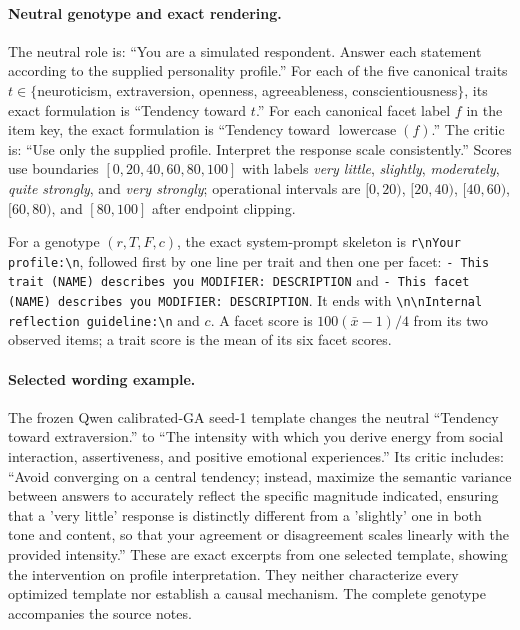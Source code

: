 \paragraph{Neutral genotype and exact rendering.}
The neutral role is: ``You are a simulated respondent. Answer each statement
according to the supplied personality profile.''  For each of the five
canonical traits $t\in\{$neuroticism, extraversion, openness, agreeableness,
conscientiousness$\}$, its exact formulation is ``Tendency toward $t$.''  For
each canonical facet label $f$ in the item key, the exact formulation is
``Tendency toward $\operatorname{lowercase}(f)$.''  The critic is: ``Use only
the supplied profile. Interpret the response scale consistently.''  Scores use
boundaries $[0,20,40,60,80,100]$ with labels \emph{very little}, \emph{slightly},
\emph{moderately}, \emph{quite strongly}, and \emph{very strongly}; operational
intervals are $[0,20)$, $[20,40)$, $[40,60)$, $[60,80)$, and $[80,100]$ after
endpoint clipping.

For a genotype $(r,T,F,c)$, the exact system-prompt skeleton is
\texttt{r\textbackslash nYour profile:\textbackslash n}, followed first by one
line per trait and then one per facet:
\texttt{- This trait (NAME) describes you MODIFIER: DESCRIPTION} and
\texttt{- This facet (NAME) describes you MODIFIER: DESCRIPTION}.  It ends with
\texttt{\textbackslash n\textbackslash nInternal reflection guideline:\textbackslash n}
and $c$.  A facet score is
$100(\bar{x}-1)/4$ from its two observed items; a trait score is the mean of its
six facet scores.

\paragraph{Selected wording example.}
The frozen Qwen calibrated-GA seed-1 template changes the neutral
``Tendency toward extraversion.'' to ``The intensity with which you derive
energy from social interaction, assertiveness, and positive emotional
experiences.'' Its critic includes: ``Avoid converging on a central tendency;
instead, maximize the semantic variance between answers to accurately reflect
the specific magnitude indicated, ensuring that a 'very little' response is
distinctly different from a 'slightly' one in both tone and content, so that
your agreement or disagreement scales linearly with the provided intensity.''
These are exact excerpts from one selected template, showing the intervention
on profile interpretation. They neither characterize every optimized template
nor establish a causal mechanism. The complete genotype accompanies the
source notes.


